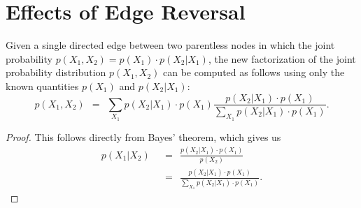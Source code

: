 \section{Effects of Edge Reversal}



\begin{lemma}
Given a single directed edge between two parentless nodes in which the joint probability $p(X_{1},X_{2}) = p(X_{1}) \cdot p(X_{2}|X_{1})$, the new factorization of the joint probability distribution $p(X_{1},X_{2})$ can be computed as follows using only the known quantities $p(X_{1})$ and $p(X_{2}|X_{1})$:
$$
p(X_{1}, X_{2})\ \ = \ \ \sum_{X_{1}} p(X_{2}|X_{1}) \cdot p(X_{1}) \frac{ p(X_{2}|X_{1}) \cdot p(X_{1}) }{ \sum_{X_{1}} p(X_{2}|X_{1}) \cdot p(X_{1})}.
$$
\end{lemma}

\begin{figure}[h!]
\begin{center}

\scalebox{1.2}{$\Big\Downarrow$} 

\end{center}
\caption{}
\end{figure}

\begin{proof}
This follows directly from Bayes' theorem, which gives us
\begin{align*} 
	p(X_{1}| X_{2})	& \ \ = \ \ \frac{p(X_{2}|X_{1}) \cdot p(X_{1})}{p(X_{2})}	\\[2em]
				& \ \ = \ \ \frac{p(X_{2}|X_{1}) \cdot p(X_{1})}{\sum_{X_{1}} p(X_{2}|X_{1}) \cdot p(X_{1})}. 
\end{align*}
\end{proof}


